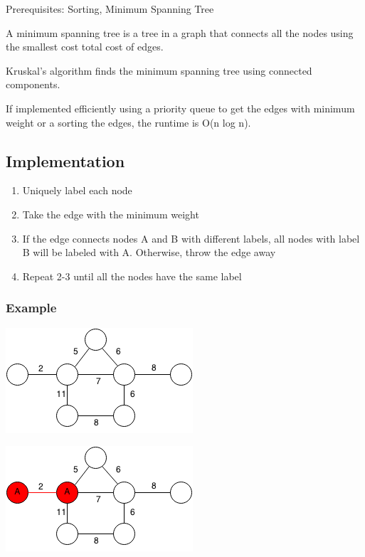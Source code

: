 \documentclass[11pt,oneside]{book}
\makeatletter
\def\maxwidth#1{\ifdim\Gin@nat@width>#1 #1\else\Gin@nat@width\fi}
\makeatother
\begin{document}
Prerequisites:  Sorting, Minimum Spanning Tree

A minimum spanning tree is a tree in a graph that connects all the nodes using the smallest cost total cost of edges.

Kruskal's algorithm finds the minimum spanning tree using connected components.

If implemented efficiently using a priority queue to get the edges with minimum weight or a sorting the edges, the runtime is O(n log n).

\subsection{Implementation}

\begin{enumerate}
\item Uniquely label each node
\item Take the edge with the minimum weight
\item If the edge connects nodes A and B with different labels, all nodes with label B will be labeled with A. Otherwise, throw the edge away
\item Repeat 2-3 until all the nodes have the same label
\end{enumerate}

\subsubsection{Example}

\includegraphics[width=\maxwidth{\textwidth}]{kruskal.png}

\includegraphics[width=\maxwidth{\textwidth}]{kruskal2.png}
\end{document}
